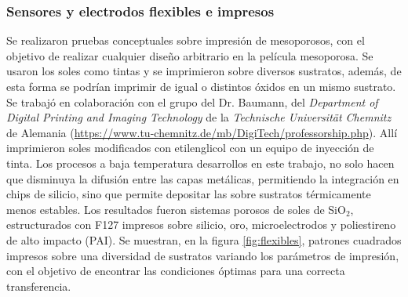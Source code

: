  	\subsubsection{Sensores y electrodos flexibles e impresos}

 	  Se realizaron pruebas conceptuales sobre impresión de mesoporosos, con el objetivo de realizar cualquier diseño arbitrario en la película mesoporosa. Se usaron los soles como tintas y se imprimieron sobre diversos sustratos, además, de esta forma se podrían imprimir \pdm\space de igual o distintos óxidos en un mismo sustrato. Se trabajó en colaboración con el grupo del Dr. Baumann, del \textit{Department of Digital Printing and Imaging Technology} de la \textit{Technische Universität Chemnitz} de Alemania (\url{https://www.tu-chemnitz.de/mb/DigiTech/professorship.php}). Allí imprimieron soles modificados con etilenglicol con un equipo de inyección de tinta. Los procesos a baja temperatura desarrollos en este trabajo, no solo hacen que disminuya la difusión entre las capas metálicas, permitiendo la integración en chips de silicio, sino que permite depositar las \pdm\space sobre sustratos térmicamente menos estables. Los resultados fueron sistemas porosos de soles de SiO$_2$, estructurados con F127 impresos sobre silicio, oro, microelectrodos y poliestireno de alto impacto (PAI). Se muestran, en la figura \ref{fig:flexibles}, patrones cuadrados impresos sobre una diversidad de sustratos variando los parámetros de impresión, con el objetivo de encontrar las condiciones óptimas para una correcta transferencia.


